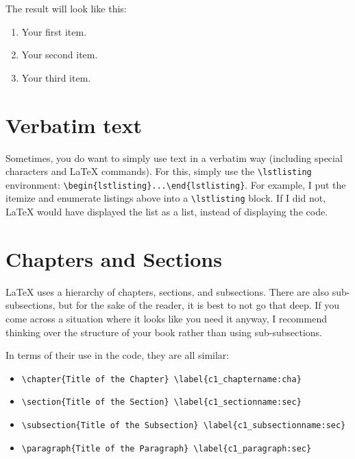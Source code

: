 The result will look like this:%
\begin{enumerate}
	\item Your first item.
	\item Your second item.
	\item Your third item.
\end{enumerate}


\section{Verbatim text}\label{c1_verbatim:sec}

Sometimes, you do want to simply use text in a verbatim way (including special characters and \LaTeX{} commands). For this, simply use the \lstinline[language=Tex]!\lstlisting! environment: \lstinline[language=Tex]!\begin{lstlisting}...\end{lstlisting}!. For example, I put the itemize and enumerate listings above into a \lstinline[language=Tex]!\lstlisting! block. If I did not, \LaTeX{} would have displayed the list as a list, instead of displaying the code.



\section{Chapters and Sections}\label{c1_chaptersandsections:sec}

\LaTeX{} uses a hierarchy of chapters, sections, and subsections. There are also sub-subsections, but for the sake of the reader, it is best to not go that deep. If you come across a situation where it looks like you need it anyway, I recommend thinking over the structure of your book rather than using sub-subsections. 

In terms of their use in the code, they are all similar:

\begin{itemize}
    \item \lstinline[language=Tex]!\chapter{Title of the Chapter} \label{c1_chaptername:cha}!
    \item \lstinline[language=Tex]!\section{Title of the Section} \label{c1_sectionname:sec}!
    \item \lstinline[language=Tex]!\subsection{Title of the Subsection} \label{c1_subsectionname:sec}!
    \item \lstinline[language=Tex]!\paragraph{Title of the Paragraph} \label{c1_paragraph:sec}!
\end{itemize}

